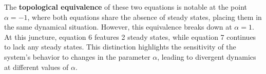 The \textbf{topological equivalence} of these two equations is notable at the point $\alpha = -1$, where both equations share the absence of steady states, placing them in the same dynamical situation. However, this equivalence breaks down at $\alpha = 1$. At this juncture, equation 6 features 2 steady states, while equation 7 continues to lack any steady states. This distinction highlights the sensitivity of the system's behavior to changes in the parameter $\alpha$, leading to divergent dynamics at different values of $\alpha$.
